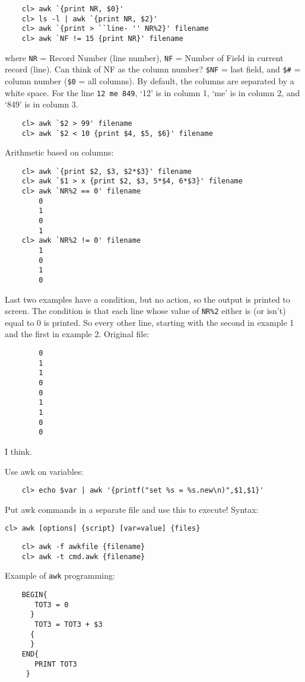\documentclass{article}
\begin{document}
\begin{verbatim}
    cl> awk `{print NR, $0}'
    cl> ls -l | awk `{print NR, $2}'
    cl> awk `{print > ``line- '' NR%2}' filename
    cl> awk `NF != 15 {print NR}' filename
\end{verbatim}
where \texttt{NR} = Record Number (line number),
\texttt{NF} = Number of Field in current record (line). Can think
of NF as the column number? \verb|$NF| = last field,
and \verb|$#| = column number (\verb|$0| = all columns).
By default, the columns are separated by a white space. For the line
\texttt{12 me 849}, `12' is in column 1, `me' is in column 2, and `849'
is in column 3.

\begin{verbatim}
    cl> awk `$2 > 99' filename
    cl> awk `$2 < 10 {print $4, $5, $6}' filename
\end{verbatim}

Arithmetic based on columns:
\begin{verbatim}
    cl> awk `{print $2, $3, $2*$3}' filename
    cl> awk `$1 > x {print $2, $3, 5*$4, 6*$3}' filename
    cl> awk `NR%2 == 0' filename
        0
        1
        0
        1
    cl> awk `NR%2 != 0' filename
        1
        0
        1
        0
\end{verbatim}
Last two examples have a condition, but no action, so the output is
printed to screen. The condition is that each line whose value of
\verb|NR%2| either is (or isn't) equal to 0 is printed. So every other
line, starting with the second in example 1 and the first in example
2. Original file:
\begin{verbatim}
        0
        1
        1
        0
        0
        1
        1
        0
        0
\end{verbatim}
I think.

Use awk on variables:
\begin{verbatim}
    cl> echo $var | awk '{printf("set %s = %s.new\n)",$1,$1}'
\end{verbatim}

Put awk commands in a separate file and use this to execute!
Syntax:

\texttt{cl> awk [options] \{script\} [var=value] \{files\}}
\begin{verbatim}
    cl> awk -f awkfile {filename}
    cl> awk -t cmd.awk {filename}
\end{verbatim}

Example of \texttt{awk} programming:
\begin{verbatim}
    BEGIN{
       TOT3 = 0
      }
       TOT3 = TOT3 + $3
      {
      }
    END{
       PRINT TOT3
     }
\end{verbatim}
\end{document}
